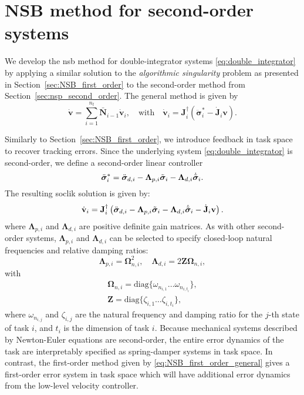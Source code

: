 \section{NSB method for second-order systems}\label{sec:nsb_second_order}
We develop the \gls{nsb} method for double-integrator systems \eqref{eq:double_integrator} by applying a similar solution to the \textit{algorithmic singularity} problem as presented in Section~\ref{sec:NSB_first_order} to the second-order method from Section~\ref{sec:nsp_second_order}. The general method is given by
\begin{equation}\label{eq:NSB_second_order_general}
    \dot{\mathbf{v}} = \sum_{i=1}^{n_t} \bar{\mathbf{N}}_{i-1}\dot{\mathbf{v}}_i, \quad \mathrm{with} \quad \dot{\mathbf{v}}_i = \mathbf{J}_i^\dagger\left(\ddot{\bm{\sigma}}_i^*-\dot{\mathbf{J}}_i \mathbf{v}\right).
\end{equation}

Similarly to Section~\ref{sec:NSB_first_order}, we introduce feedback in task space to recover tracking errors. Since the underlying system \eqref{eq:double_integrator} is second-order, we define a second-order linear controller
\begin{equation}
       \ddot{\bm{\sigma}}_i^* = \ddot{\bm{\sigma}}_{d,i} - \bm{\Lambda}_{p,i} \Tilde{\bm{\sigma}}_i - \bm{\Lambda}_{d,i} \dot{\Tilde{\bm{\sigma}}}_i.
\end{equation}
The resulting \gls{soclik} solution is given by:
\begin{equation}\label{eq:SOCLIK}
    \dot{\mathbf{v}}_i =  \mathbf{J}_i^\dagger\left(\ddot{\bm{\sigma}}_{d,i} - \bm{\Lambda}_{p,i} \Tilde{\bm{\sigma}}_i - \bm{\Lambda}_{d,i} \dot{\Tilde{\bm{\sigma}}}_i-\dot{\mathbf{J}}_i \mathbf{v}\right).
\end{equation}
where $\bm{\Lambda}_{p,i}$ and $\bm{\Lambda}_{d,i}$ are positive definite gain matrices. As with other second-order systems, $\bm{\Lambda}_{p,i}$ and $\bm{\Lambda}_{d,i}$ can be selected to specify closed-loop natural frequencies and relative damping ratios:
\begin{equation}
    \bm{\Lambda}_{p,i} = \bm{\Omega}_{n,i}^2, \quad \bm{\Lambda}_{d,i} = 2\mathbf{Z} \bm{\Omega}_{n,i},
\end{equation}
with
\begin{align}
    \bm{\Omega}_{n,i} = \mathrm{diag}\{\omega_{n_{i,1}} \ldots \omega_{n_{i,t_i}} \},\\
    \mathbf{Z} = \mathrm{diag}\{\zeta_{i,1} \ldots \zeta_{i,t_i} \},
\end{align}
where $\omega_{n_{i,j}}$ and $\zeta_{i,j}$ are the natural frequency and damping ratio for the $j$-th state of task $i$, and  $t_i$ is the dimension of task $i$. Because mechanical systems described by Newton-Euler equations are second-order, the entire error dynamics of the task are interpretably specified as spring-damper systems in task space. In contrast, the first-order method given by \eqref{eq:NSB_first_order_general} gives a first-order error system in task space which will have additional error dynamics from the low-level velocity controller. 